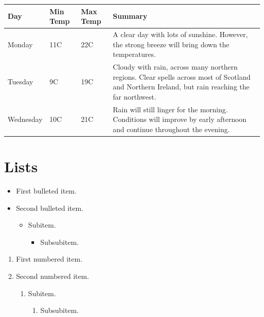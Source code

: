 \documentclass[10pt]{article}
\begin{document}
\begin{table}[H]
\centering
\begin{tabular}{ | l | l | l | p{8cm} |}
\hline
Day & Min Temp & Max Temp & Summary \\ \hline
Monday & 11C & 22C & A clear day with lots of sunshine.  However, the strong breeze will bring down the temperatures. \\ \hline
Tuesday & 9C & 19C & Cloudy with rain, across many northern regions. Clear spells across most of Scotland and Northern Ireland, but rain reaching the far northwest. \\ \hline
Wednesday & 10C & 21C & Rain will still linger for the morning. Conditions will improve by early afternoon and continue throughout the evening. \\
\hline
\end{tabular}
\end{table}

\section{Lists}

\begin{itemize}

\item First bulleted item.

\item Second bulleted item.

    \begin{itemize}

    \item Subitem.

        \begin{itemize}

        \item Subsubitem.

        \end{itemize}

    \end{itemize}

\end{itemize}


\begin{enumerate}

\item First numbered item.

\item Second numbered item.

    \begin{enumerate}

    \item Subitem.

        \begin{enumerate}

        \item Subsubitem.

        \end{enumerate}

    \end{enumerate}

\end{enumerate}
\end{document}
